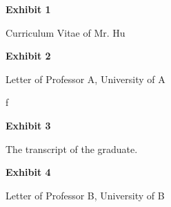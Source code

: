 \documentclass{article}
\begin{document}
\clearpage

\vspace*{\fill}
\begin{center}

{\LARGE \bf
Exhibit 1
}

\vspace{10\baselineskip}

{\large Curriculum Vitae of Mr. Hu}

\end{center}
\vspace*{\fill}

% 

\vspace*{\fill}
\begin{center}

{\LARGE \bf
Exhibit 2
}

\vspace{10\baselineskip}

{\large Letter of Professor A, University of A}

\end{center}
\vspace*{\fill}
f
% 

\vspace*{\fill}
\begin{center}

{\LARGE \bf
Exhibit 3
}

\vspace{10\baselineskip}

{\large The transcript of the graduate.}

\end{center}
\vspace*{\fill}

 


\vspace*{\fill}
\begin{center}

{\LARGE \bf
Exhibit 4
}

\vspace{10\baselineskip}

{\large Letter of Professor B, University of B}

\end{center}
\vspace*{\fill}
\end{document}
